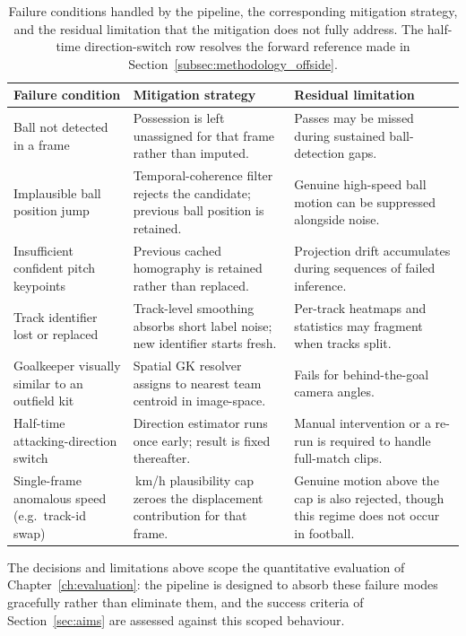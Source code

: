 \begin{table}[!htbp]
\centering
\small
\renewcommand{\arraystretch}{1.2}
    \begin{tabular}{
  >{\raggedright\arraybackslash}p{4.2cm}
  >{\raggedright\arraybackslash}p{4.6cm}
  >{\raggedright\arraybackslash}p{4.4cm}
}
\toprule
\textbf{Failure condition} & \textbf{Mitigation strategy} & \textbf{Residual limitation} \\
\midrule
Ball not detected in a frame & Possession is left unassigned for that frame rather than imputed. & Passes may be missed during sustained ball-detection gaps. \\
Implausible ball position jump & Temporal-coherence filter rejects the candidate; previous ball position is retained. & Genuine high-speed ball motion can be suppressed alongside noise. \\
Insufficient confident pitch keypoints & Previous cached homography is retained rather than replaced. & Projection drift accumulates during sequences of failed inference. \\
Track identifier lost or replaced & Track-level smoothing absorbs short label noise; new identifier starts fresh. & Per-track heatmaps and statistics may fragment when tracks split. \\
Goalkeeper visually similar to an outfield kit & Spatial GK resolver assigns to nearest team centroid in image-space. & Fails for behind-the-goal camera angles. \\
Half-time attacking-direction switch & Direction estimator runs once early; result is fixed thereafter. & Manual intervention or a re-run is required to handle full-match clips. \\
Single-frame anomalous speed (e.g.\ track-id swap) & 40\,km/h plausibility cap zeroes the displacement contribution for that frame. & Genuine motion above the cap is also rejected, though this regime does not occur in football. \\
\bottomrule
\end{tabular}
\caption[Failure conditions and mitigation strategies.]{Failure conditions handled by the pipeline, the corresponding
mitigation strategy, and the residual limitation that the mitigation does
not fully address. The half-time direction-switch row resolves the forward
reference made in Section~\ref{subsec:methodology_offside}.}
\label{tab:failure_handling}
\end{table}

The decisions and limitations above scope the quantitative evaluation of
Chapter~\ref{ch:evaluation}: the pipeline is designed to absorb these
failure modes gracefully rather than eliminate them, and the success
criteria of Section~\ref{sec:aims} are assessed against this scoped
behaviour.